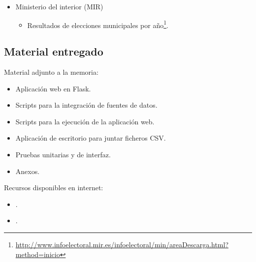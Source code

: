\begin{itemize}
\begin{itemize}
		Relación de municipios y códigos por provincias\footnote{\href{http://www.ine.es/daco/daco42/codmun/codmunmapa.htm}{http://www.ine.es/daco/daco42/codmun/codmunmapa.htm}}.
	\end{itemize}
	\item
	Ministerio del interior (MIR)
	\begin{itemize}
		\item 
		Resultados de elecciones municipales por año\footnote{\href{http://www.infoelectoral.mir.es/infoelectoral/min/areaDescarga.html?method=inicio}{http://www.infoelectoral.mir.es/infoelectoral/min/areaDescarga.html?method=inicio}}.
	\end{itemize}
\end{itemize}


\subsection{Material entregado}

Material adjunto a la memoria:

\begin{itemize}
	\item 
	Aplicación web en Flask.
	\item 
	Scripts para la integración de fuentes de datos.
	\item
	Scripts para la ejecución de la aplicación web.
	\item 
	Aplicación de escritorio para juntar ficheros CSV.
	\item 
	Pruebas unitarias y de interfaz.
	\item 
	Anexos.
\end{itemize}

Recursos disponibles en internet:

\begin{itemize}
	\item 
	.
	\item
	.
\end{itemize}
